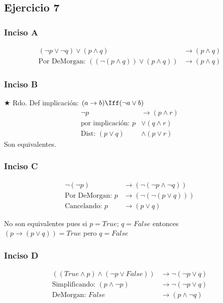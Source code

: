 \subsection{Ejercicio 7}
\subsubsection{Inciso A}

\begin{align*}
    (\neg p \vee \neg q) \vee (p \wedge q) &\rightarrow (p \wedge q) \\
    \text{Por DeMorgan: } ((\neg(p \wedge q)) \vee (p \wedge q)) &\rightarrow (p \wedge q)
\end{align*}

\subsubsection{Inciso B}

$\bigstar$ Rdo. Def implicación: $(a \rightarrow b) \Iff (\neg a \vee b)$ 
\begin{align*}
    \neg p &\rightarrow (p \wedge r) \\
    \text{por implicación: } p &\vee (q \wedge r)\\
    \text{Dist: } (p\vee q) &\wedge (p\vee r)
\end{align*}
Son equivalentes.

\subsubsection{Inciso C}

\begin{align*}
    \neg(\neg p) &\rightarrow (\neg (\neg p \wedge \neg q)) \\
    \text{Por DeMorgan: }p &\rightarrow (\neg (\neg (p \vee q))) \\
    \text{Cancelando: }p &\rightarrow (p \vee q)
\end{align*}

No son equivalentes pues si $p = True$; $q = False$ entonces $(p \rightarrow (p \vee q)) = True$ pero $q = False$

\subsubsection{Inciso D}
\begin{align*}
    ((True \wedge p) \wedge (\neg p \vee False)) &\rightarrow \neg ( \neg p \vee q) \\
    \text{Simplificando: } (p \wedge \neg p ) &\rightarrow \neg ( \neg p \vee q) \\
    \text{DeMorgan: } False &\rightarrow (p\wedge \neg q)
\end{align*}

